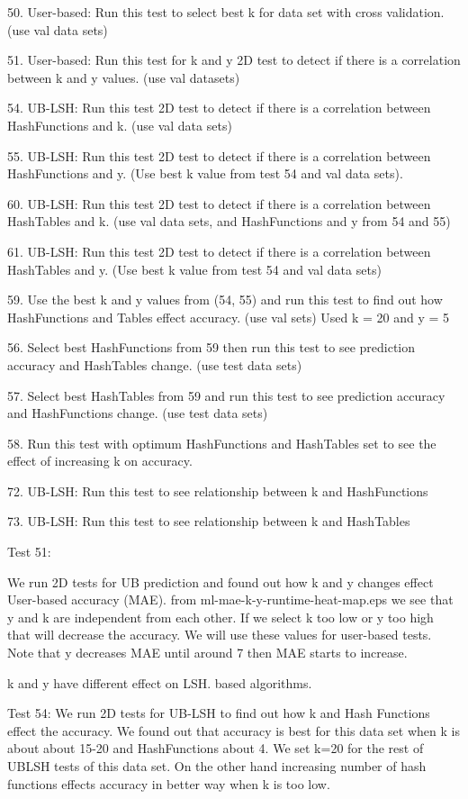 50. User-based: Run  this test to select best k for data set with cross validation. (use val data sets)

51. User-based: Run this test for k and y 2D test to detect if there is a correlation between k and y values. (use val datasets)

54. UB-LSH: Run this test 2D test to detect if there is a correlation between HashFunctions and k. (use val data sets)

55. UB-LSH: Run this test 2D test to detect if there is a correlation between HashFunctions and y. (Use best k value from test 54 and val data sets).

60. UB-LSH: Run this test 2D test to detect if there is a correlation between HashTables and k. (use val data sets, and HashFunctions and y from 54 and 55)

61. UB-LSH: Run this test 2D test to detect if there is a correlation between HashTables and y. (Use best k value from test 54 and val data sets)

59. Use the best k and y values from (54, 55) and run this test to find out how HashFunctions and Tables effect accuracy. (use val sets) Used k = 20 and y = 5

56. Select best HashFunctions from 59 then run this test to see prediction accuracy and HashTables change. (use test data sets)

57. Select best  HashTables from 59 and run this test to see prediction accuracy and HashFunctions change. (use test data sets)

58. Run this test with optimum HashFunctions and HashTables set to see the effect of increasing k on accuracy.

72. UB-LSH: Run this test to see relationship between k and HashFunctions

73. UB-LSH: Run this test to see relationship between k and HashTables


Test 51:

We run 2D tests for UB prediction and found out how k and y changes effect User-based accuracy (MAE).
from ml-mae-k-y-runtime-heat-map.eps we see that y and k are independent from each other. If we select k too low or y too high that will decrease the accuracy. We will use these values for user-based tests. Note that y decreases MAE until around 7 then MAE starts to increase.

k and y have different effect on LSH. based algorithms.

Test 54:
We run 2D tests for UB-LSH to find out how k and Hash Functions effect the accuracy. We found out that accuracy is best for this data set when k is about about 15-20  and  HashFunctions about 4. We set k=20 for the rest of UBLSH tests of this data set.
On the other hand increasing number of hash functions effects accuracy in better way when k is too low.



